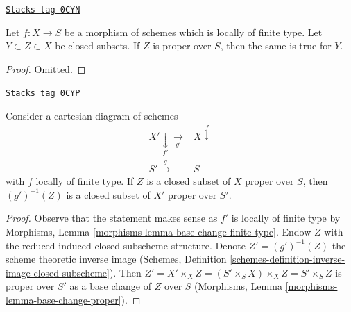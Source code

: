 \begin{lemma}
\label{coherent-lemma-closed-closed-proper-over-base}
\href{https://stacks.math.columbia.edu/tag/0CYN}{\texttt{Stacks tag 0CYN}}

Let $f : X \to S$ be a morphism of schemes which is locally of finite type.
Let $Y \subset Z \subset X$ be closed subsets.
If $Z$ is proper over $S$, then the same is true for $Y$.
\end{lemma}

\begin{proof}
Omitted.
\end{proof}

\begin{lemma}
\label{coherent-lemma-base-change-closed-proper-over-base}
\href{https://stacks.math.columbia.edu/tag/0CYP}{\texttt{Stacks tag 0CYP}}

Consider a cartesian diagram of schemes
$$
\begin{array}{cc}X' \underset{f'}{\downarrow}\underset{g'}{\longrightarrow} & X \overset{f}{\downarrow} \\ S' \overset{g}{\longrightarrow} & S\end{array}
$$
with $f$ locally of finite type.
If $Z$ is a closed subset of $X$ proper over $S$, then
$(g')^{-1}(Z)$ is a closed subset of $X'$ proper over $S'$.
\end{lemma}

\begin{proof}
Observe that the statement makes sense as $f'$ is locally of
finite type by Morphisms, Lemma \ref{morphisms-lemma-base-change-finite-type}.
Endow $Z$ with the reduced induced closed subscheme structure.
Denote $Z' = (g')^{-1}(Z)$ the scheme theoretic inverse image
(Schemes, Definition \ref{schemes-definition-inverse-image-closed-subscheme}).
Then $Z' = X' \times_X Z = (S' \times_S X) \times_X Z = S' \times_S Z$
is proper over $S'$ as a base change of $Z$ over $S$
(Morphisms, Lemma \ref{morphisms-lemma-base-change-proper}).
\end{proof}

